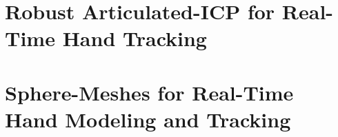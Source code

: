 

\usepackage{cite}
\usepackage{amsmath}
\usepackage{microtype}
\usepackage{overpic}
\usepackage{color}
\usepackage{amssymb}
\usepackage{graphicx}
\usepackage{changepage}
\usepackage{hyperref}
\usepackage{longtable}

\hypersetup{
    colorlinks=true,
    filecolor=magenta,      
    urlcolor=cyan,
}

  








\frontmatter

%
%
%
%

\tableofcontents

\setlength{\parskip}{1em}

\mainmatter



\chapter{Robust Articulated-ICP for Real-Time Hand Tracking} \label{ch:tracking}












\chapter{Sphere-Meshes for Real-Time Hand Modeling and Tracking} \label{ch:sphere-meshes}




 







